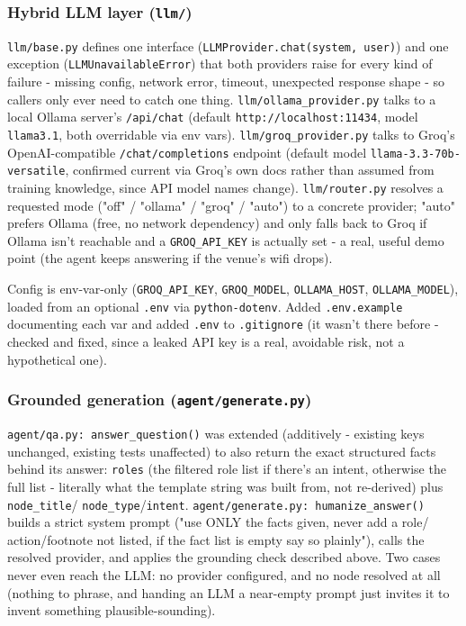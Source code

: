 \subsubsection*{Hybrid LLM layer (\texttt{llm/\allowbreak{}})}
\texttt{llm/\allowbreak{}base.py} defines one interface (\texttt{LLMProvider.chat(system, user)}) and one exception (\texttt{LLMUnavailableError}) that both providers raise for every kind of failure - missing config, network error, timeout, unexpected response shape - so callers only ever need to catch one thing. \texttt{llm/\allowbreak{}ollama\_\allowbreak{}provider.py} talks to a local Ollama server's \texttt{/\allowbreak{}api/\allowbreak{}chat} (default \texttt{http:/\allowbreak{}/\allowbreak{}localhost:11434}, model \texttt{llama3.1}, both overridable via env vars). \texttt{llm/\allowbreak{}groq\_\allowbreak{}provider.py} talks to Groq's OpenAI-compatible \texttt{/\allowbreak{}chat/\allowbreak{}completions} endpoint (default model \texttt{llama-3.3-70b-versatile}, confirmed current via Groq's own docs rather than assumed from training knowledge, since API model names change). \texttt{llm/\allowbreak{}router.py} resolves a requested mode ("off" / "ollama" / "groq" / "auto") to a concrete provider; "auto" prefers Ollama (free, no network dependency) and only falls back to Groq if Ollama isn't reachable and a \texttt{GROQ\_\allowbreak{}API\_\allowbreak{}KEY} is actually set - a real, useful demo point (the agent keeps answering if the venue's wifi drops).

Config is env-var-only (\texttt{GROQ\_\allowbreak{}API\_\allowbreak{}KEY}, \texttt{GROQ\_\allowbreak{}MODEL}, \texttt{OLLAMA\_\allowbreak{}HOST}, \texttt{OLLAMA\_\allowbreak{}MODEL}), loaded from an optional \texttt{.env} via \texttt{python-dotenv}. Added \texttt{.env.example} documenting each var and added \texttt{.env} to \texttt{.gitignore} (it wasn't there before - checked and fixed, since a leaked API key is a real, avoidable risk, not a hypothetical one).

\subsubsection*{Grounded generation (\texttt{agent/\allowbreak{}generate.py})}
\texttt{agent/\allowbreak{}qa.py: answer\_\allowbreak{}question()} was extended (additively - existing keys unchanged, existing tests unaffected) to also return the exact structured facts behind its answer: \texttt{roles} (the filtered role list if there's an intent, otherwise the full list - literally what the template string was built from, not re-derived) plus \texttt{node\_\allowbreak{}title}/ \texttt{node\_\allowbreak{}type}/\texttt{intent}. \texttt{agent/\allowbreak{}generate.py: humanize\_\allowbreak{}answer()} builds a strict system prompt ("use ONLY the facts given, never add a role/ action/footnote not listed, if the fact list is empty say so plainly"), calls the resolved provider, and applies the grounding check described above. Two cases never even reach the LLM: no provider configured, and no node resolved at all (nothing to phrase, and handing an LLM a near-empty prompt just invites it to invent something plausible-sounding).

